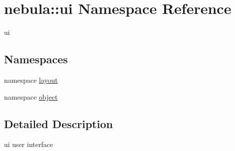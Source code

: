 \hypertarget{namespacenebula_1_1ui}{
\section{nebula::ui Namespace Reference}
\label{namespacenebula_1_1ui}
}


ui  
\subsection*{Namespaces}
\begin{DoxyCompactItemize}
\item 
namespace \hyperlink{namespacenebula_1_1ui_1_1layout}{layout}
\item 
namespace \hyperlink{namespacenebula_1_1ui_1_1object}{object}
\end{DoxyCompactItemize}


\subsection{Detailed Description}
ui user interface 